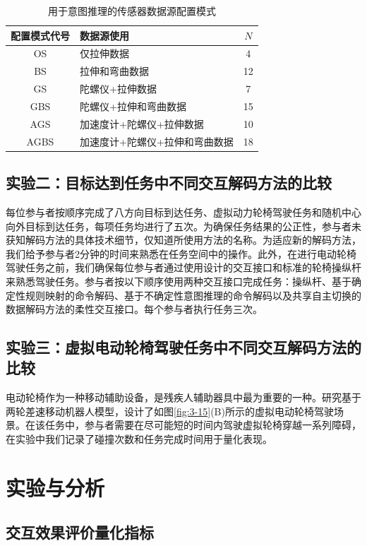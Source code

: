 \begin{table}
    \centering
    \caption{用于意图推理的传感器数据源配置模式}
    \setlength{\tabcolsep}{3pt}
    \begin{tabular}{c p{180pt} c }
    \hline\hline
    配置模式代号 & 数据源使用 & $N$ \\ 
    \hline
    OS& 仅拉伸数据& 4 \\ 
    BS& 拉伸和弯曲数据&12 \\ 
    GS& 陀螺仪+拉伸数据&7 \\ 
    GBS& 陀螺仪+拉伸和弯曲数据&15 \\ 
    AGS& 加速度计+陀螺仪+拉伸数据&10 \\ 
    AGBS& 加速度计+陀螺仪+拉伸和弯曲数据&18 \\ 
    \hline\hline
    \end{tabular}
    \label{tab3-1}
\end{table}     

\subsection{实验二：目标达到任务中不同交互解码方法的比较} 每位参与者按顺序完成了八方向目标到达任务、虚拟动力轮椅驾驶任务和随机中心向外目标到达任务，每项任务均进行了五次。为确保任务结果的公正性，参与者未获知解码方法的具体技术细节，仅知道所使用方法的名称。为适应新的解码方法，我们给予参与者2分钟的时间来熟悉在任务空间中的操作。此外，在进行电动轮椅驾驶任务之前，我们确保每位参与者通过使用设计的交互接口和标准的轮椅操纵杆来熟悉驾驶任务。参与者按以下顺序使用两种交互接口完成任务：操纵杆、基于确定性规则映射的命令解码、基于不确定性意图推理的命令解码以及共享自主切换的数据解码方法的柔性交互接口。每个参与者执行任务三次。 

\subsection{实验三：虚拟电动轮椅驾驶任务中不同交互解码方法的比较}电动轮椅作为一种移动辅助设备，是残疾人辅助器具中最为重要的一种。研究基于两轮差速移动机器人模型，设计了如图\ref{fig:3-15}(B)所示的虚拟电动轮椅驾驶场景。在该任务中，参与者需要在尽可能短的时间内驾驶虚拟轮椅穿越一系列障碍，在实验中我们记录了碰撞次数和任务完成时间用于量化表现。

\section{实验与分析}

\subsection{交互效果评价量化指标}   
